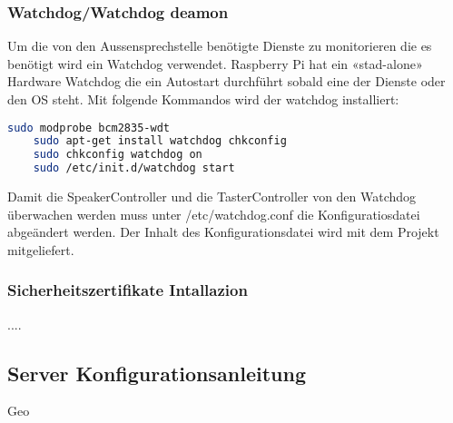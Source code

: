\subsubsection{Watchdog/Watchdog deamon}
Um die von den Aussensprechstelle benötigte Dienste zu monitorieren die es benötigt wird ein Watchdog verwendet. Raspberry Pi hat ein «stad-alone» Hardware Watchdog die ein Autostart durchführt sobald eine der Dienste oder den OS steht. 
Mit folgende Kommandos wird der watchdog installiert:
\begin{lstlisting}[backgroundcolor = \color{snippetcolor},
language = bash,
xleftmargin = 1cm,
framexleftmargin = 0.1em,
breaklines=true]
	sudo modprobe bcm2835-wdt
	sudo apt-get install watchdog chkconfig
	sudo chkconfig watchdog on
	sudo /etc/init.d/watchdog start
\end{lstlisting}
Damit die SpeakerController und die TasterController von den Watchdog überwachen werden muss unter /etc/watchdog.conf die Konfiguratiosdatei abgeändert werden. Der Inhalt des Konfigurationsdatei wird mit dem Projekt mitgeliefert. 

\subsubsection{Sicherheitszertifikate Intallazion}
....

\subsection{Server Konfigurationsanleitung}
Geo 